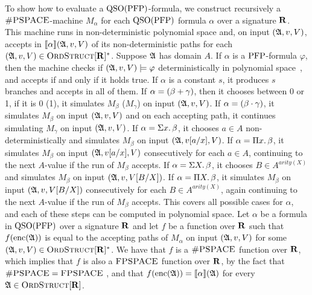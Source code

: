 To show how to evaluate a ${\rm QSO}({\rm PFP})$-formula, we construct recursively a $\text{\sc \#PSPACE}$-machine $M_{\alpha}$ for each ${\rm QSO}({\rm PFP})$ formula $\alpha$ over a signature $\mathbf{R}$. This machine runs in non-deterministic polynomial space and, on input $(\mathfrak{A},v,V)$, accepts in ${\llbracket{}{\alpha}\rrbracket}(\mathfrak{A},v,V)$ of its non-deterministic paths for each $(\mathfrak{A},v,V) \in \text{\sc OrdStruct}[\mathbf{R}]^*$. Suppose $\mathfrak{A}$ has domain $A$. If $\alpha$ is a ${\rm PFP}$-formula $\varphi$, then the machine checks if $(\mathfrak{A},v,V)\models\varphi$ deterministically in polynomial space~\cite{L04}, and accepts if and only if it holds true. If $\alpha$ is a constant $s$, it produces $s$ branches and accepts in all of them. If $\alpha = (\beta + \gamma)$, then it chooses between 0 or 1, if it is 0 (1), it simulates $M_{\beta}$ ($M_{\gamma}$) on input $(\mathfrak{A},v,V)$. If $\alpha = (\beta \cdot \gamma)$, it simulates $M_{\beta}$ on input $(\mathfrak{A},v,V)$ and on each accepting path, it continues simulating $M_{\gamma}$ on input $(\mathfrak{A},v,V)$.
If $\alpha = \Sigma{x}.\,\beta$, it chooses $a\in A$ non-deterministically and simulates $M_{\beta}$ on input $(\mathfrak{A},v[a/x],V)$. If $\alpha = \Pi{x}.\,\beta$, it simulates $M_{\beta}$ on input $(\mathfrak{A},v[a/x],V)$ consecutively for each $a\in A$, continuing to the next $A$-value if the run of $M_{\beta}$ accepts. If $\alpha = \Sigma{X}.\,\beta$, it chooses $B\in A^{arity(X)}$ and simulates $M_{\beta}$ on input $(\mathfrak{A},v,V[B/X])$. If $\alpha = \Pi{X}.\,\beta$, it simulates $M_{\beta}$ on input $(\mathfrak{A},v,V[B/X])$ consecutively for each $B\in A^{arity(X)}$, again continuing to the next $A$-value if the run of $M_{\beta}$ accepts. This covers all possible cases for $\alpha$, and each of these steps can be computed in polynomial space. Let $\alpha$ be a formula in ${\rm QSO}({\rm PFP})$ over a signature $\mathbf{R}$ and let $f$ be a function over $\mathbf{R}$ such that $f({\rm enc}(\mathfrak{A}))$ is equal to the accepting paths of $M_{\alpha}$ on input $(\mathfrak{A},v,V)$ for some $(\mathfrak{A},v,V) \in \text{\sc OrdStruct}[\mathbf{R}]^*$. We have that $f$ is a $\text{\sc \#PSPACE}$ function over $\mathbf{R}$, which implies that $f$ is also a $\text{\sc FPSPACE}$ function over $\mathbf{R}$, by the fact that $\text{\sc \#PSPACE} = \text{\sc FPSPACE}$ \cite{Ladner89}, and that $f({\rm enc}(\mathfrak{A})) = {\llbracket{}{\alpha}\rrbracket}(\mathfrak{A})$ for every $\mathfrak{A}\in\text{\sc OrdStruct}[\mathbf{R}]$.

